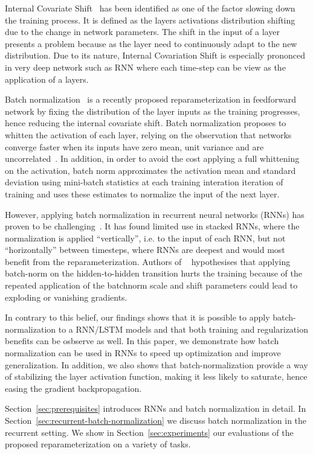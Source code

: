 \documentclass{article} %
\begin{document}
Internal Covariate Shift~\cite{shimodaira2000improving,batchnorm} has been identified as one of the factor slowing down the training process.
It is defined as the layers activations distribution shifting due to the change in network parameters.
The shift in the input of a layer presents a problem because as the layer need to continuously
adapt to the new distribution. Due to its nature, Internal Covariation Shift is especially prononced in very deep network such as RNN where each time-step can be view as the application of a layers.

Batch normalization~\cite{batchnorm} is a recently proposed reparameterization in feedforward network by fixing the distribution of the layer inputs as the training progresses, hence reducing the internal covariate shift.
Batch normalization proposes to whitten the activation of each layer, relying on the observation that networks converge faster when its inputs
have zero mean, unit variance and are uncorrelated~\cite{efficientbackprop}.
In addition, in order to avoid the cost applying a full whittening on the activation,
batch norm approximates the activation mean and standard deviation using mini-batch statistics at each training interation
iteration of training and uses these estimates to normalize the input of the next layer.

However, applying batch normalization in recurrent neural networks (RNNs) has proven to be challenging~\cite{cesar,baidu}.
It has found limited use in stacked RNNs, where the normalization is applied ``vertically'', i.e. to the input of each RNN, but not ``horizontally'' between timesteps, where RNNs are deepest and would most benefit from the reparameterization.
Authors of ~\cite{cesar} hypothesises that applying batch-norm on the hidden-to-hidden transition hurts the training
because of the repeated application of the batchnorm scale and shift parameters could lead to exploding or vanishing gradients.

In contrary to this belief, our findings shows that it is possible to apply batch-normalization to a RNN/LSTM models and that both training and regularization
benefits can be osbserve as well. In this paper, we demonstrate how batch normalization can be used in RNNs to speed up optimization and improve
generalization. In addition, we also shows that batch-normalization provide a way of stabilizing the layer activation function, making it less likely
to saturate, hence easing the gradient backpropagation.


Section~\ref{sec:prerequisites} introduces RNNs and batch normalization in detail.
In Section~\ref{sec:recurrent-batch-normalization} we discuss batch normalization in the recurrent setting.
We show in Section~\ref{sec:experiments} our evaluations of the proposed reparameterization on a variety of tasks.
\end{document}
